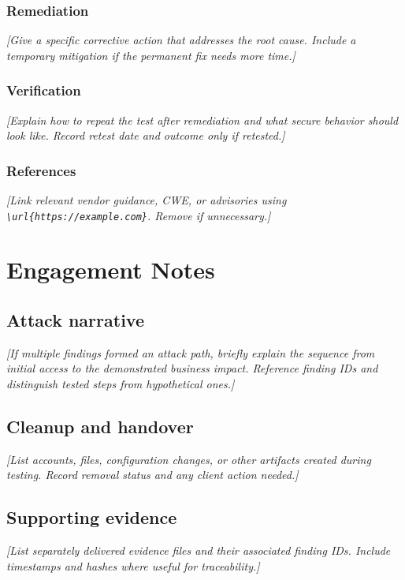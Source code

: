 \documentclass[11pt,letterpaper]{article}
\newcommand{\prompt}[1]{\textit{\textcolor{muted}{[#1]}}}
\begin{document}
\subsubsection*{Remediation}
\prompt{Give a specific corrective action that addresses the root cause.
Include a temporary mitigation if the permanent fix needs more time.}

\subsubsection*{Verification}
\prompt{Explain how to repeat the test after remediation and what secure
behavior should look like. Record retest date and outcome only if retested.}

\subsubsection*{References}
\prompt{Link relevant vendor guidance, CWE, or advisories using
\texttt{\textbackslash url\{https://example.com\}}. Remove if unnecessary.}

\clearpage
\appendix
\section{Engagement Notes}
\subsection{Attack narrative}
\prompt{If multiple findings formed an attack path, briefly explain the
sequence from initial access to the demonstrated business impact. Reference
finding IDs and distinguish tested steps from hypothetical ones.}

\subsection{Cleanup and handover}
\prompt{List accounts, files, configuration changes, or other artifacts
created during testing. Record removal status and any client action needed.}

\subsection{Supporting evidence}
\prompt{List separately delivered evidence files and their associated finding
IDs. Include timestamps and hashes where useful for traceability.}
\end{document}
